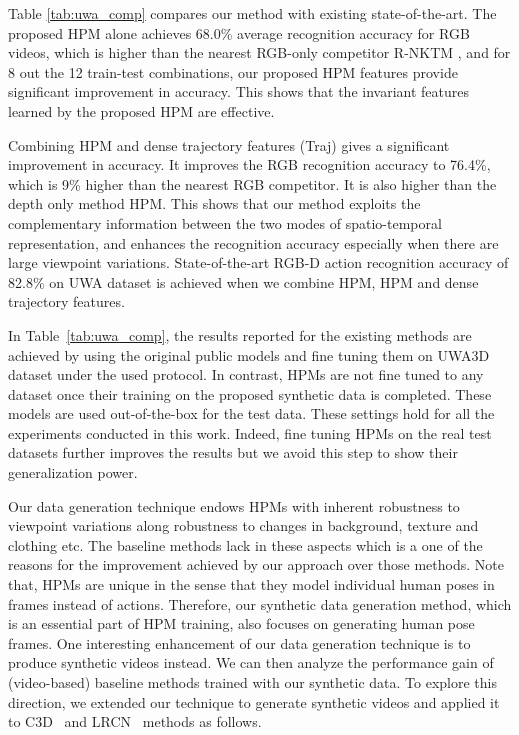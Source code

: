 \documentclass[twocolumn]{svjour3}          \smartqed  \usepackage{graphicx}
\begin{document}
Table \ref{tab:uwa_comp} compares our method with existing state-of-the-art. The proposed HPM alone achieves 68.0\% average recognition accuracy for RGB videos, which is higher than the nearest RGB-only competitor R-NKTM \citep{rahmani2017learning}, and for 8 out the 12 train-test combinations, our proposed HPM features provide significant improvement in accuracy. This shows that the invariant features learned by the proposed HPM are effective.

Combining HPM and dense trajectory features (Traj) gives a significant improvement in accuracy. It improves the RGB recognition accuracy to 76.4\%, which is 9\% higher than the nearest RGB competitor. It is also higher than the depth only method HPM. This shows that our method exploits the complementary information between the two modes of spatio-temporal representation, and enhances the recognition accuracy especially when there are large viewpoint variations. State-of-the-art RGB-D action recognition accuracy of 82.8\% on UWA dataset is achieved when we combine HPM, HPM and dense trajectory features.


In Table~\ref{tab:uwa_comp},  the results reported for the existing methods are achieved by using the original public models  and fine tuning them on UWA3D dataset under the used protocol. In contrast,  HPMs are not fine tuned to any dataset once  their training on the proposed synthetic data is completed. These  models are used out-of-the-box for the test data. These settings hold for all the experiments conducted in this work.  Indeed, fine tuning HPMs  on the real test datasets further improves the results but we avoid this step to show their generalization power.

Our data generation technique endows HPMs with inherent robustness to viewpoint variations along robustness to changes in  background, texture and clothing etc. The  baseline methods lack in these aspects which is a one of the reasons for the improvement achieved by our approach over those methods.  Note that, HPMs are unique in the sense that they model individual human poses in frames instead of actions. Therefore, our synthetic data generation method, which is an essential part of HPM training,  also focuses on generating human pose frames. One interesting enhancement of our data generation technique is to produce  synthetic videos instead. We can then  analyze the performance gain of (video-based) baseline methods  trained with our synthetic data. To explore this direction, we extended our technique to generate  synthetic videos and applied it to  C3D~\citep{tran2015learning} and LRCN~\citep{LRCN} methods as follows.
\end{document}
